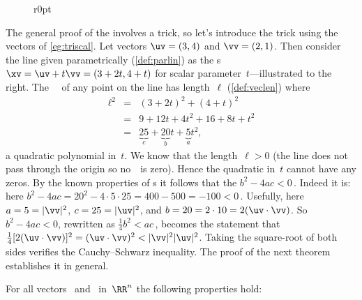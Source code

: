 \begin{figure}r{0pt}
\end{figure}
\begin{example} 
The general proof of the  involves a trick, so let's introduce the trick using the vectors of \cref{eg:triscal}.
Let vectors \(\uv=(3,4)\) and \(\vv=(2,1)\).
Then consider the line given parametrically (\cref{def:parlin}) as the s \(\xv=\uv+t\vv=(3+2t,4+t)\) for scalar parameter~\(t\)---illustrated to the right.
The ~\xv\ of any point on the line has length~\(\ell\) (\cref{def:veclen}) where
\begin{eqnarray*}
\ell^2&=&(3+2t)^2+(4+t)^2
\\&=&9+12t+4t^2+16+8t+t^2
\\&=&\underbrace{25}_{c}+\underbrace{20}_{b}t+\underbrace{5}_{a}t^2,
\end{eqnarray*}
a quadratic polynomial in~\(t\).
We know that the length~\(\ell>0\)  (the line does not pass through the origin so no~\xv\ is zero).
Hence the quadratic in~\(t\) cannot have any zeros.
By the known properties of s it follows that the  \(b^2-4ac<0\)\,.
Indeed it is: here \(b^2-4ac=20^2-4\cdot5\cdot25=400-500=-100<0\)\,.
Usefully, here \(a=5=|\vv|^2\), \(c=25=|\uv|^2\), and \(b=20=2\cdot10=2(\uv\cdot\vv)\).
So \(b^2-4ac<0\), rewritten as \(\tfrac14b^2<ac\)\,, becomes the statement that \(\tfrac14[2(\uv\cdot\vv)]^2=(\uv\cdot\vv)^2<|\vv|^2|\uv|^2\).
Taking the square-root of both sides verifies the Cauchy--Schwarz inequality.  
The proof of the next theorem establishes it in general.
\end{example}






\begin{theorem} \label{thm:triscal}
For all vectors \uv\ and \vv\ in~\(\RR^n\) the following properties hold:
\end{theorem}

